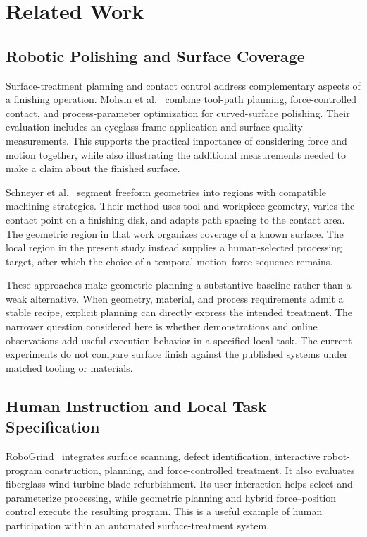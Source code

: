 \chapter{Related Work}
\label{chap:related_work}

\section{Robotic Polishing and Surface Coverage}
Surface-treatment planning and contact control address complementary aspects of a finishing operation. Mohsin et al.~\cite{mohsin2019path} combine tool-path planning, force-controlled contact, and process-parameter optimization for curved-surface polishing. Their evaluation includes an eyeglass-frame application and surface-quality measurements. This supports the practical importance of considering force and motion together, while also illustrating the additional measurements needed to make a claim about the finished surface.

Schneyer et al.~\cite{schneyer2023segmentation} segment freeform geometries into regions with compatible machining strategies. Their method uses tool and workpiece geometry, varies the contact point on a finishing disk, and adapts path spacing to the contact area. The geometric region in that work organizes coverage of a known surface. The local region in the present study instead supplies a human-selected processing target, after which the choice of a temporal motion--force sequence remains.

These approaches make geometric planning a substantive baseline rather than a weak alternative. When geometry, material, and process requirements admit a stable recipe, explicit planning can directly express the intended treatment. The narrower question considered here is whether demonstrations and online observations add useful execution behavior in a specified local task. The current experiments do not compare surface finish against the published systems under matched tooling or materials.

\section{Human Instruction and Local Task Specification}
RoboGrind~\cite{alt2024robogrind} integrates surface scanning, defect identification, interactive robot-program construction, planning, and force-controlled treatment. It also evaluates fiberglass wind-turbine-blade refurbishment. Its user interaction helps select and parameterize processing, while geometric planning and hybrid force--position control execute the resulting program. This is a useful example of human participation within an automated surface-treatment system.

